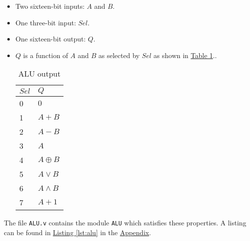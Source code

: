 \begin{itemize}
    \item Two sixteen-bit inputs: $A$ and $B$.
    \item One three-bit input: $Sel$.
    \item One sixteen-bit output: $Q$.
    \item $Q$ is a function of $A$ and $B$ as selected by $Sel$ as shown in \hyperref[tab:alu]{Table \ref*{tab:alu}}..
        \begin{table}[htbp]
            \centering
            \begin{tabular}{ll}             \toprule
                $Sel$       & $Q$           \\\midrule
                0           & $0$           \\
                1           & $A + B$       \\
                2           & $A - B$       \\
                3           & $A$           \\
                4           & $A \oplus B$  \\
                5           & $A \lor B$    \\
                6           & $A \land B$   \\
                7           & $A + 1$       \\\bottomrule
            \end{tabular}
            \caption{ALU output}
            \label{tab:alu}
        \end{table}
\end{itemize}

The file \verb|ALU.v| contains the module \verb|ALU| which satisfies these properties.
A listing can be found in \hyperref[lst:alu]{Listing \ref*{lst:alu}} in the \hyperref[sec:appendix]{Appendix}.
